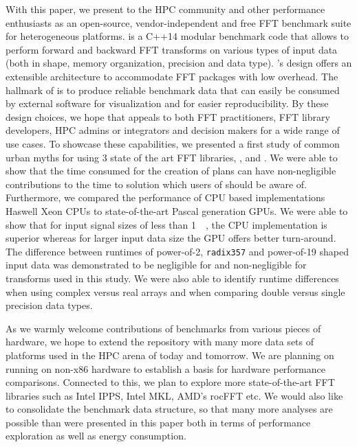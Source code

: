 
With this paper, we present \gearshifft{} to the HPC community and other performance enthusiasts as an open-source, vendor-independent and free FFT benchmark suite for heterogeneous platforms. \gearshifft{} is a C++14 modular benchmark code that allows to perform forward and backward FFT transforms on various types of input data (both in shape, memory organization, precision and data type). \gearshifft{}'s design offers an extensible architecture to accommodate FFT packages with low overhead. The hallmark of \gearshifft{} is to produce reliable benchmark data that can easily be consumed by external software for visualization and for easier reproducibility. By these design choices, we hope that \gearshifft{} appeals to both FFT practitioners, FFT library developers, HPC admins or integrators and decision makers for a wide range of use cases. To showcase these capabilities, we presented a first study of common urban myths for using 3 state of the art FFT libraries, \fftw{}, \clfft{} and \cufft{}. We were able to show that the time consumed for the creation of \fftw{} plans can have non-negligible contributions to the time to solution which users of \fftw{} should be aware of. Furthermore, we compared the performance of CPU based implementations Haswell Xeon CPUs to state-of-the-art Pascal generation \nvidia{} GPUs. We were able to show that for input signal sizes of less than \SI{1}{\mebi\byte}, the CPU implementation is superior whereas for larger input data size the GPU offers better turn-around. The difference between runtimes of power-of-2, {\tt radix357} and power-of-19 shaped input data was demonstrated to be negligible for \fftw{} and non-negligible for \cufft{} transforms used in this study. We were also able to identify runtime differences when using complex versus real arrays and when comparing double versus single precision data types.     

As we warmly welcome contributions of benchmarks from various pieces of hardware, we hope to extend the \gearshifft{} repository with many more data sets of platforms used in the HPC arena of today and tomorrow. We are planning on running \gearshifft{} on non-x86 hardware to establish a basis for hardware performance comparisons. Connected to this, we plan to explore more state-of-the-art FFT libraries such as Intel IPPS, Intel MKL, AMD's rocFFT etc. We would also like to consolidate the benchmark data structure, so that many more analyses are possible than were presented in this paper both in terms of performance exploration as well as energy consumption.  

